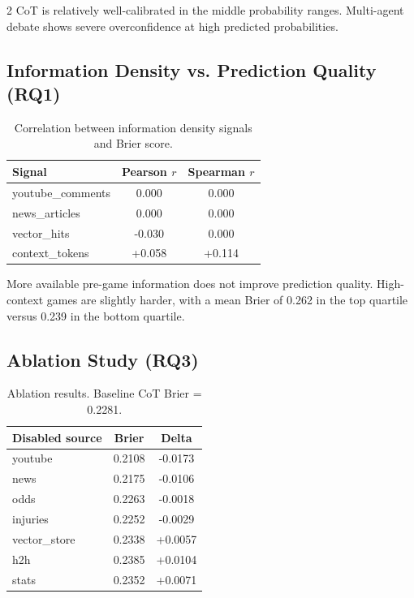 \documentclass[11pt]{article}
\begin{document}
\begin{multicols}{2}
CoT is relatively well-calibrated in the middle probability ranges. Multi-agent debate shows severe overconfidence at high predicted probabilities.

\subsection{Information Density vs. Prediction Quality (RQ1)}

\begin{table}[H]
\centering
\caption{Correlation between information density signals and Brier score.}
\label{tab:density}
\begin{tabular}{lcc}
\toprule
Signal & Pearson $r$ & Spearman $r$ \\
\midrule
youtube\_comments & 0.000 & 0.000 \\
news\_articles    & 0.000 & 0.000 \\
vector\_hits      & -0.030 & 0.000 \\
context\_tokens   & +0.058 & +0.114 \\
\bottomrule
\end{tabular}
\end{table}

More available pre-game information does not improve prediction quality. High-context games are slightly harder, with a mean Brier of 0.262 in the top quartile versus 0.239 in the bottom quartile.

\subsection{Ablation Study (RQ3)}

\begin{table}[H]
\centering
\caption{Ablation results. Baseline CoT Brier = 0.2281.}
\label{tab:ablation}
\begin{tabular}{lcc}
\toprule
Disabled source & Brier & Delta \\
\midrule
youtube      & 0.2108 & -0.0173 \\
news         & 0.2175 & -0.0106 \\
odds         & 0.2263 & -0.0018 \\
injuries     & 0.2252 & -0.0029 \\
vector\_store & 0.2338 & +0.0057 \\
h2h          & 0.2385 & +0.0104 \\
stats        & 0.2352 & +0.0071 \\
\bottomrule
\end{tabular}
\end{table}


\end{multicols}
\end{document}
